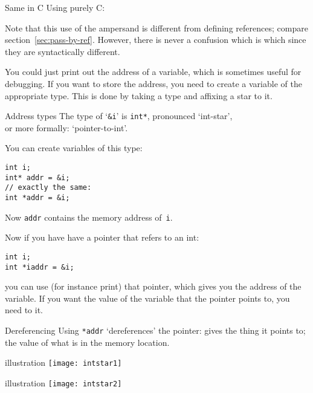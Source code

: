 \begin{block}{Same in C}
    \label{sl:ampersandc}
  Using purely C:
%
%
\end{block}

Note that this use of the ampersand is different from defining
references; compare section~\ref{sec:pass-by-ref}. However, there is
never a confusion which is which since they are syntactically
different.

You could just print out the address of a variable, which is sometimes
useful for debugging. If you want to store the address, you need to
create a variable of the appropriate type. This is done by taking a
type and affixing a star to it.

\begin{block}{Address types}
  \label{sl:intstar}
  The type of `\lstinline{&i}' is \lstinline{int*}, pronounced `int-star',\\
  or more
  formally: `pointer-to-int'.

  You can create variables of this type:
\begin{lstlisting}
int i;
int* addr = &i;
// exactly the same:
int *addr = &i;
\end{lstlisting}
Now \lstinline{addr} contains the memory address of~\lstinline{i}.
\end{block}

Now if you have have a pointer that refers to an int:
\begin{lstlisting}
int i;
int *iaddr = &i;
\end{lstlisting}
you can use (for instance print) that pointer, which gives you the
address of the variable. If you want the value of the variable that
the pointer points to, you need to  it.

\begin{block}{Dereferencing}
  \label{sl:starderef}
  Using \lstinline{*addr} `dereferences' the pointer: gives the thing it
  points to;\\
  the value of what
  is in the memory location.
\end{block}

\begin{block}{illustration}
  \label{sl:copy-pic}
  \texttt{[image: intstar1]}
\end{block}

\begin{block}{illustration}
  \label{sl:deref-pic}
  \texttt{[image: intstar2]}
\end{block}

